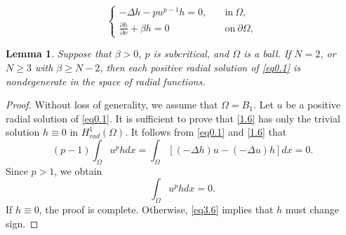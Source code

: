 \documentclass[10pt,a4paper]{amsart}
\newtheorem{lemma}{Lemma}
\begin{document}
\begin{equation}\label{1.6}
\begin{cases}
-\Delta h-pu^{p-1}h=0, \quad &\text{in}\ \Omega,\\
\frac{\partial h}{\partial \nu}+\beta h=0 &\text{on}\ \partial\Omega,
\end{cases}
\end{equation}

\begin{lemma}\label{lemma3.1}
Suppose that $\beta>0$, $p$ is subcritical, and $\Omega$ is a ball. If $N=2$, or $N\ge 3$ with $\beta\ge N-2$, then each positive radial solution of \eqref{eq0.1} is nondegenerate in the space of radial functions.
\end{lemma}

\begin{proof}
Without loss of generality, we assume that $\Omega=B_1$. Let $u$ be a positive radial solution of \eqref{eq0.1}. It is sufficient to prove that \eqref{1.6} has only the trivial solution $h\equiv0$ in $H^1_{rad}(\Omega)$. It follows from \eqref{eq0.1} and \eqref{1.6} that 
$$
(p-1)\int_{\Omega}u^phdx=\int_{\Omega}[(-\Delta h)u-(-\Delta u)h]dx=0.
$$
Since $p>1$, we obtain 
\begin{equation}\label{eq3.6}
\int_{\Omega}u^phdx=0.
\end{equation}
If $h\equiv 0$, the proof is complete. Otherwise, \eqref{eq3.6} implies that $h$ must change sign. 


\end{proof}
\end{document}

